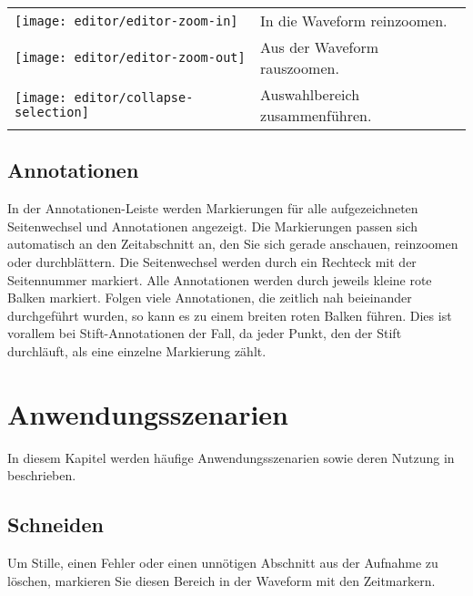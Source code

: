 \begin{longtable}{p{1cm}p{12cm}}
	\begin{minipage}{.035\textwidth}
		\texttt{[image: editor/editor-zoom-in]}
	\end{minipage}
	& In die Waveform reinzoomen. \\

	\begin{minipage}{.035\textwidth}
		\texttt{[image: editor/editor-zoom-out]}
	\end{minipage}
	& Aus der Waveform rauszoomen. \\

	\begin{minipage}{.035\textwidth}
		\texttt{[image: editor/collapse-selection]}
	\end{minipage}
	& Auswahlbereich zusammenführen. \\
\end{longtable}


\subsection{Annotationen}
In der Annotationen-Leiste werden Markierungen für alle aufgezeichneten Seitenwechsel und Annotationen angezeigt. Die Markierungen passen sich automatisch an den Zeitabschnitt an, den Sie sich gerade anschauen, reinzoomen oder durchblättern. Die Seitenwechsel werden durch ein Rechteck mit der Seitennummer markiert. Alle Annotationen werden durch jeweils kleine rote Balken markiert. Folgen viele Annotationen, die zeitlich nah beieinander durchgeführt wurden, so kann es zu einem breiten roten Balken führen. Dies ist vorallem bei Stift-Annotationen der Fall, da jeder Punkt, den der Stift durchläuft, als eine einzelne Markierung zählt.


\section{Anwendungsszenarien}
In diesem Kapitel werden häufige Anwendungsszenarien sowie deren Nutzung in \lectEditor{} beschrieben.

\subsection{Schneiden}
Um Stille, einen Fehler oder einen unnötigen Abschnitt aus der Aufnahme zu löschen, markieren Sie diesen Bereich in der Waveform mit den Zeitmarkern.

